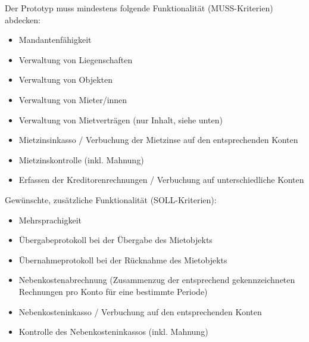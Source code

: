 \newpage
Der Prototyp muss mindestens folgende Funktionalität (MUSS-Kriterien) abdecken:
\begin{itemize} \label{musskrit}
  \item Mandantenfähigkeit
  \item Verwaltung von Liegenschaften
  \item Verwaltung von Objekten
  \item Verwaltung von Mieter/innen
  \item Verwaltung von Mietverträgen (nur Inhalt, siehe unten)
  \item Mietzinsinkasso / Verbuchung der Mietzinse auf den entsprechenden Konten
  \item Mietzinskontrolle (inkl. Mahnung)
  \item Erfassen der Kreditorenrechnungen / Verbuchung auf unterschiedliche Konten
\end{itemize}

\vspace{3mm}
Gewünschte, zusätzliche Funktionalität (SOLL-Kriterien):
\begin{itemize}
  \item Mehrsprachigkeit
  \item Übergabeprotokoll bei der Übergabe des Mietobjekts
  \item Übernahmeprotokoll bei der Rücknahme des Mietobjekts
  \item Nebenkostenabrechnung (Zusammenzug der entsprechend gekennzeichneten Rechnungen pro Konto für eine bestimmte Periode)
  \item Nebenkosteninkasso / Verbuchung auf den entsprechenden Konten
  \item Kontrolle des Nebenkosteninkassos (inkl. Mahnung)
\end{itemize}

